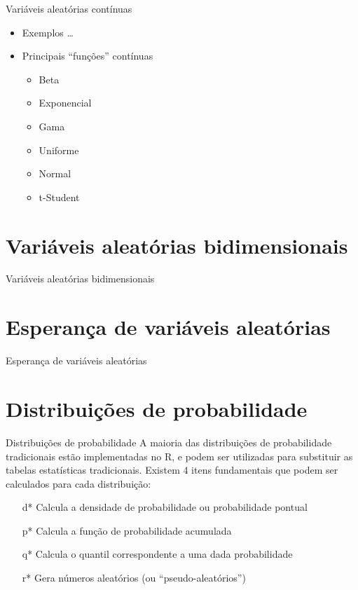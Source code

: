 \documentclass[10pt]{beamer}\usepackage{graphicx, color}
\begin{document}
\begin{frame}{Variáveis aleatórias contínuas}
  \begin{itemize}
  \item Exemplos \ldots
  \item Principais ``funções'' contínuas
    \begin{itemize}
    \item Beta
    \item Exponencial
    \item Gama
    \item Uniforme
    \item Normal
    \item t-Student
    \end{itemize}
  \end{itemize}
\end{frame}


\section{Variáveis aleatórias bidimensionais}
\label{sec:vabi}

\begin{frame}{Variáveis aleatórias bidimensionais}

\end{frame}

\section{Esperança de variáveis aleatórias}
\label{sec:eva}

\begin{frame}{Esperança de variáveis aleatórias}

\end{frame}

\section{Distribuições de probabilidade}

\begin{frame}[fragile=singleslide]{Distribuições de probabilidade}
A maioria das distribuições de probabilidade tradicionais estão
implementadas no R, e podem ser utilizadas para substituir as tabelas
estatísticas tradicionais. Existem 4 itens fundamentais que podem ser
calculados para cada distribuição:
\begin{itemize}
\item[d*] Calcula a densidade de probabilidade ou probabilidade pontual
\item[p*] Calcula a função de probabilidade acumulada
\item[q*] Calcula o quantil correspondente a uma dada probabilidade
\item[r*] Gera números aleatórios (ou ``pseudo-aleatórios'')
\end{itemize}
\end{frame}
\end{document}
